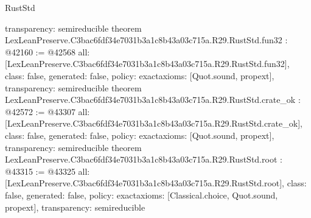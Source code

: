 \begin{lexlean}{RustStd}
\begin{coremodule}
{  transparency: semireducible
}
theorem LexLeanPreserve.C3bac6fdf34e7031b3a1c8b43a03c715a.R29.RustStd.fun32 : @42160 := @42568 {
  all: [LexLeanPreserve.C3bac6fdf34e7031b3a1c8b43a03c715a.R29.RustStd.fun32],
  class: false,
  generated: false,
  policy: exact{axioms: [Quot.sound, propext]},
  transparency: semireducible
}
theorem LexLeanPreserve.C3bac6fdf34e7031b3a1c8b43a03c715a.R29.RustStd.crate_ok : @42572 := @43307 {
  all: [LexLeanPreserve.C3bac6fdf34e7031b3a1c8b43a03c715a.R29.RustStd.crate_ok],
  class: false,
  generated: false,
  policy: exact{axioms: [Quot.sound, propext]},
  transparency: semireducible
}
theorem LexLeanPreserve.C3bac6fdf34e7031b3a1c8b43a03c715a.R29.RustStd.root : @43315 := @43325 {
  all: [LexLeanPreserve.C3bac6fdf34e7031b3a1c8b43a03c715a.R29.RustStd.root],
  class: false,
  generated: false,
  policy: exact{axioms: [Classical.choice, Quot.sound, propext]},
  transparency: semireducible
}


\end{coremodule}
\end{lexlean}
